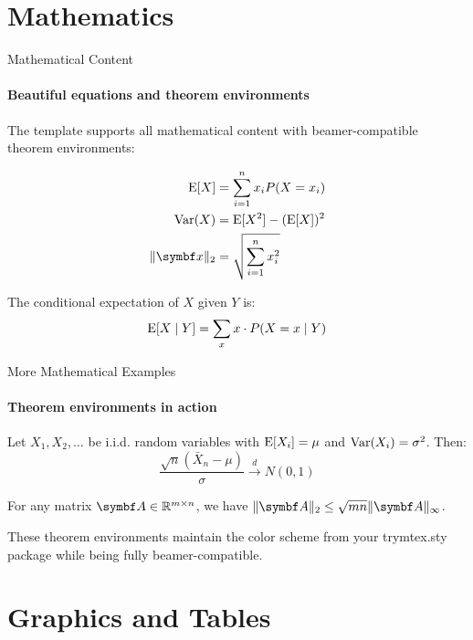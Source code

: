 \documentclass[aspectratio=169]{beamer}
\begin{document}
\section{Mathematics}

\begin{frame}{Mathematical Content}
    \framesubtitle{Beautiful equations and theorem environments}
    
    The template supports all mathematical content with beamer-compatible theorem environments:
    
    \begin{align}
        \E[X] &= \sum_{i=1}^n x_i P(X = x_i) \\
        \Var(X) &= \E[X^2] - (\E[X])^2 \\
        \norm{\bm{x}}_2 &= \sqrt{\sum_{i=1}^n x_i^2}
    \end{align}
    
    \begin{definition}
        The conditional expectation of $X$ given $Y$ is:
        \[ \mathrm{E}[X \mid Y] = \sum_x x \cdot P(X = x \mid Y) \]
    \end{definition}
\end{frame}

\begin{frame}{More Mathematical Examples}
    \framesubtitle{Theorem environments in action}
    
    \begin{theorem}
        Let $X_1, X_2, \ldots$ be i.i.d. random variables with $\mathrm{E}[X_i] = \mu$ and $\mathrm{Var}(X_i) = \sigma^2$. Then:
        \[ \frac{\sqrt{n}(\bar{X}_n - \mu)}{\sigma} \xrightarrow{d} N(0,1) \]
    \end{theorem}
    
    \begin{lemma}
        For any matrix $\bm{A} \in \R^{m \times n}$, we have $\norm{\bm{A}}_2 \leq \sqrt{mn} \norm{\bm{A}}_{\infty}$.
    \end{lemma}
    
    \begin{remark}
        These theorem environments maintain the color scheme from your trymtex.sty package while being fully beamer-compatible.
    \end{remark}
\end{frame}

\section{Graphics and Tables}
\end{document}
